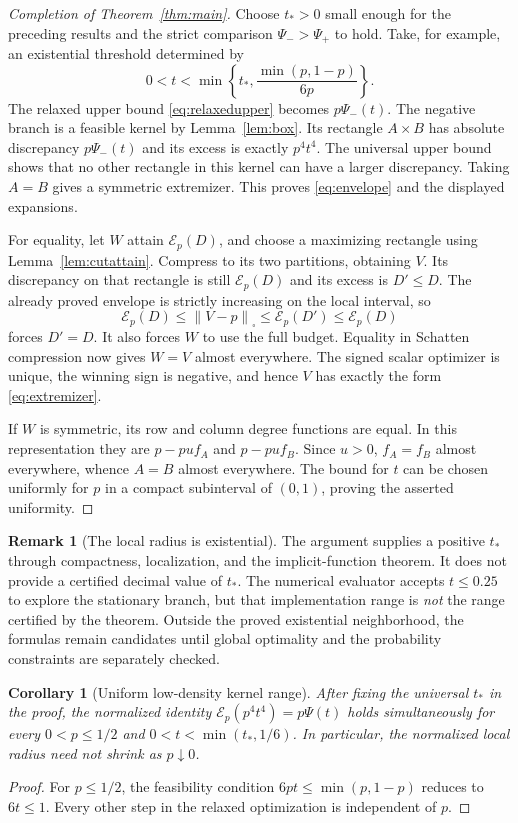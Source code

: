 \documentclass[11pt]{article}
\newtheorem{corollary}[theorem]{Corollary}
\theoremstyle{definition}
\newtheorem{remark}[theorem]{Remark}
\newcommand{\1}{\mathbf 1}
\newcommand{\Cut}[1]{\left\|#1\right\|_{\square}}
\newcommand{\calE}{\mathcal E}
\begin{document}
\begin{proof}[Completion of Theorem~\ref{thm:main}]
Choose $t_*>0$ small enough for the preceding results and the strict comparison $\Psi_->\Psi_+$ to hold. Take, for example, an existential threshold determined by
\[
 0<t<\min\left\{t_*,\frac{\min(p,1-p)}{6p}\right\}.
\]
The relaxed upper bound \eqref{eq:relaxedupper} becomes $p\Psi_-(t)$. The negative branch is a feasible kernel by Lemma~\ref{lem:box}. Its rectangle $A\times B$ has absolute discrepancy $p\Psi_-(t)$ and its excess is exactly $p^4t^4$. The universal upper bound shows that no other rectangle in this kernel can have a larger discrepancy. Taking $A=B$ gives a symmetric extremizer. This proves \eqref{eq:envelope} and the displayed expansions.

For equality, let $W$ attain $\calE_p(D)$, and choose a maximizing rectangle using Lemma~\ref{lem:cutattain}. Compress to its two partitions, obtaining $V$. Its discrepancy on that rectangle is still $\calE_p(D)$ and its excess is $D'\le D$. The already proved envelope is strictly increasing on the local interval, so
\[
 \calE_p(D)\le\Cut{V-p}\le\calE_p(D')\le\calE_p(D)
\]
forces $D'=D$. It also forces $W$ to use the full budget. Equality in Schatten compression now gives $W=V$ almost everywhere. The signed scalar optimizer is unique, the winning sign is negative, and hence $V$ has exactly the form \eqref{eq:extremizer}.

If $W$ is symmetric, its row and column degree functions are equal. In this representation they are $p-pu f_A$ and $p-pu f_B$. Since $u>0$, $f_A=f_B$ almost everywhere, whence $A=B$ almost everywhere. The bound for $t$ can be chosen uniformly for $p$ in a compact subinterval of $(0,1)$, proving the asserted uniformity.
\end{proof}

\begin{remark}[The local radius is existential]
The argument supplies a positive $t_*$ through compactness, localization, and the implicit-function theorem. It does not provide a certified decimal value of $t_*$. The numerical evaluator accepts $t\le0.25$ to explore the stationary branch, but that implementation range is \emph{not} the range certified by the theorem. Outside the proved existential neighborhood, the formulas remain candidates until global optimality and the probability constraints are separately checked.
\end{remark}

\begin{corollary}[Uniform low-density kernel range]\label{cor:sparse}
After fixing the universal $t_*$ in the proof, the normalized identity
$\calE_p(p^4t^4)=p\Psi(t)$ holds simultaneously for every $0<p\le1/2$ and
$0<t<\min(t_*,1/6)$. In particular, the normalized local radius need not
shrink as $p\downarrow0$.
\end{corollary}
\begin{proof}
For $p\le1/2$, the feasibility condition $6pt\le\min(p,1-p)$ reduces
to $6t\le1$. Every other step in the relaxed optimization is independent of $p$.
\end{proof}
\end{document}
